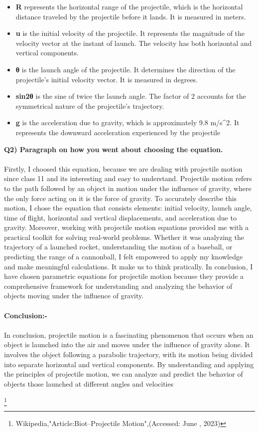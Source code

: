 \documentclass{article}
\begin{document}
\begin{itemize}
\item
  \textbf{R} represents the horizontal range of the projectile, which is
  the horizontal distance traveled by the projectile before it lands. It
  is measured in meters.
\item
  \textbf{u} is the initial velocity of the projectile. It represents
  the magnitude of the velocity vector at the instant of launch. The
  velocity has both horizontal and vertical components.
\item
  \textbf{θ} is the launch angle of the projectile. It determines the
  direction of the projectile's initial velocity vector. It is measured
  in degrees.
\item
  \textbf{sin2θ} is the sine of twice the launch angle. The factor of 2
  accounts for the symmetrical nature of the projectile's trajectory.
\item
  \textbf{g} is the acceleration due to gravity, which is approximately
  9.8 m/s\^{}2. It represents the downward acceleration experienced by
  the projectile
\end{itemize}

\textbf{Q2) Paragraph on how you went about choosing the equation.}
\\
\\
Firstly, I choosed this equation, because we are dealing with projectile
motion since class 11 and its interesting and easy to understand.
Projectile motion refers to the path followed by an object in motion
under the influence of gravity, where the only force acting on it is the
force of gravity. To accurately describe this motion, I chose the
equation that consists elements: initial velocity, launch angle, time of
flight, horizontal and vertical displacements, and acceleration due to
gravity. Moreover, working with projectile motion equations provided me
with a practical toolkit for solving real-world problems. Whether it was
analyzing the trajectory of a launched rocket, understanding the motion
of a baseball, or predicting the range of a cannonball, I felt empowered
to apply my knowledge and make meaningful calculations. It make us to
think pratically. In conclusion, I have chosen parametric equations for
projectile motion because they provide a comprehensive framework for
understanding and analyzing the behavior of objects moving under the
influence of gravity.
\\
\\
\textbf{Conclusion:-}
\\
\\
In conclusion, projectile motion is a fascinating phenomenon that occurs
when an object is launched into the air and moves under the influence of
gravity alone. It involves the object following a parabolic trajectory,
with its motion being divided into separate horizontal and vertical
components. By understanding and applying the principles of projectile
motion, we can analyze and predict the behavior of objects those launched at different angles and velocities



\footnote{Wikipedia,"Article:Biot–Projectile Motion",(Accessed: June , 2023)}
\end{document}
